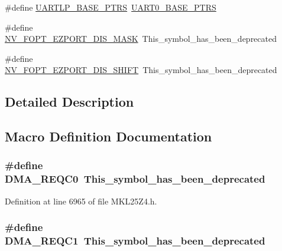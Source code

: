 \begin{DoxyCompactItemize}
\#define \hyperlink{group___backward___compatibility___symbols_ga1913c55fe9312bdb0414edc7553329f3}{U\+A\+R\+T\+L\+P\+\_\+\+B\+A\+S\+E\+\_\+\+P\+T\+RS}~\hyperlink{group___u_a_r_t0___peripheral_ga9416d89d2bc04eb37311da5910f1c701}{U\+A\+R\+T0\+\_\+\+B\+A\+S\+E\+\_\+\+P\+T\+RS}
\item 
\#define \hyperlink{group___backward___compatibility___symbols_ga5c130a6f11de9f04a77b36fd61843e8f}{N\+V\+\_\+\+F\+O\+P\+T\+\_\+\+E\+Z\+P\+O\+R\+T\+\_\+\+D\+I\+S\+\_\+\+M\+A\+SK}~This\+\_\+symbol\+\_\+has\+\_\+been\+\_\+deprecated
\item 
\#define \hyperlink{group___backward___compatibility___symbols_gabf1111ccacc4104b2855c4f3851cbaa5}{N\+V\+\_\+\+F\+O\+P\+T\+\_\+\+E\+Z\+P\+O\+R\+T\+\_\+\+D\+I\+S\+\_\+\+S\+H\+I\+FT}~This\+\_\+symbol\+\_\+has\+\_\+been\+\_\+deprecated
\end{DoxyCompactItemize}


\subsection{Detailed Description}


\subsection{Macro Definition Documentation}
\subsubsection[{\texorpdfstring{D\+M\+A\+\_\+\+R\+E\+Q\+C0}{DMA_REQC0}}]{\setlength{\rightskip}{0pt plus 5cm}\#define D\+M\+A\+\_\+\+R\+E\+Q\+C0~This\+\_\+symbol\+\_\+has\+\_\+been\+\_\+deprecated}\hypertarget{group___backward___compatibility___symbols_ga734643acca0a28e7a07dc8c705fbc1f8}{}\label{group___backward___compatibility___symbols_ga734643acca0a28e7a07dc8c705fbc1f8}


Definition at line 6965 of file M\+K\+L25\+Z4.\+h.

\subsubsection[{\texorpdfstring{D\+M\+A\+\_\+\+R\+E\+Q\+C1}{DMA_REQC1}}]{\setlength{\rightskip}{0pt plus 5cm}\#define D\+M\+A\+\_\+\+R\+E\+Q\+C1~This\+\_\+symbol\+\_\+has\+\_\+been\+\_\+deprecated}\hypertarget{group___backward___compatibility___symbols_gadfccb3dbbd2bc4fc89afd35a2743d074}{}\label{group___backward___compatibility___symbols_gadfccb3dbbd2bc4fc89afd35a2743d074}


